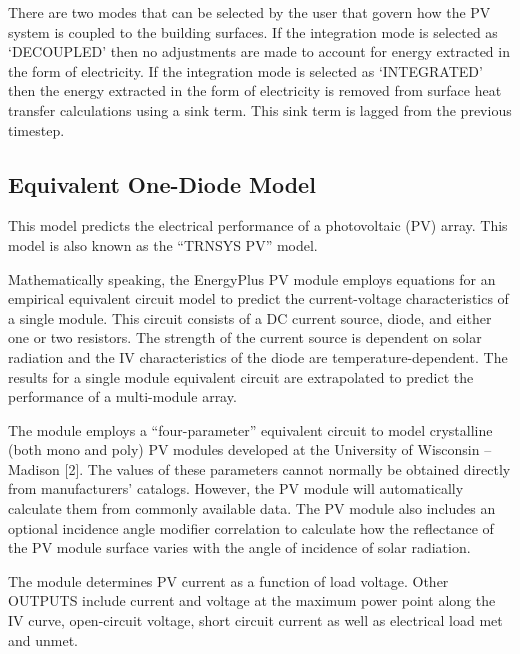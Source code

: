 There are two modes that can be selected by the user that govern how the PV system is coupled to the building surfaces. If the integration mode is selected as `DECOUPLED' then no adjustments are made to account for energy extracted in the form of electricity. If the integration mode is selected as `INTEGRATED' then the energy extracted in the form of electricity is removed from surface heat transfer calculations using a sink term. This sink term is lagged from the previous timestep.

\subsection{Equivalent One-Diode Model}\label{equivalent-one-diode-model}

This model predicts the electrical performance of a photovoltaic (PV) array. This model is also known as the ``TRNSYS PV'' model.

Mathematically speaking, the EnergyPlus PV module employs equations for an empirical equivalent circuit model to predict the current-voltage characteristics of a single module. This circuit consists of a DC current source, diode, and either one or two resistors. The strength of the current source is dependent on solar radiation and the IV characteristics of the diode are temperature-dependent. The results for a single module equivalent circuit are extrapolated to predict the performance of a multi-module array.

The module employs a ``four-parameter'' equivalent circuit to model crystalline (both mono and poly) PV modules developed at the University of Wisconsin -- Madison {[}2{]}. The values of these parameters cannot normally be obtained directly from manufacturers' catalogs. However, the PV module will automatically calculate them from commonly available data. The PV module also includes an optional incidence angle modifier correlation to calculate how the reflectance of the PV module surface varies with the angle of incidence of solar radiation.

The module determines PV current as a function of load voltage. Other OUTPUTS include current and voltage at the maximum power point along the IV curve, open-circuit voltage, short circuit current as well as electrical load met and unmet.

